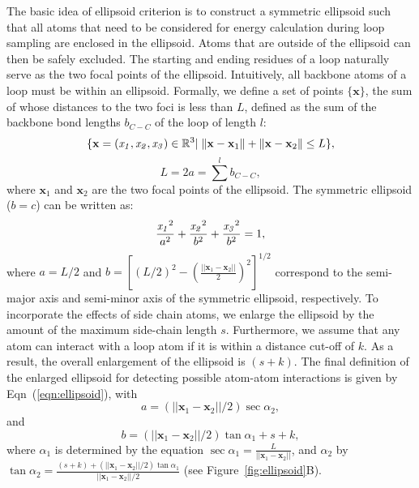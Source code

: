 The basic idea of ellipsoid criterion is to construct a symmetric
ellipsoid such that all atoms that need to be considered for energy
calculation during loop sampling are enclosed in the ellipsoid.
Atoms that are outside of the ellipsoid can then be safely excluded.
The starting and ending residues of a loop naturally serve as the
two focal points of the ellipsoid. Intuitively, all backbone atoms
of a loop must be within an ellipsoid. Formally, we define a set of
points $\{\mathbf{x}\}$, the sum of whose distances to the two foci
is less than $L$, defined as the sum of the backbone bond lengths
$b_{C-C}$ of the loop of length $l$:
$$
\{\mathbf{x} = ({\it x_1}, {\it x_2}, {\it x_3}) \in \mathbb{R}^3|
\; \|\mathbf{x} - \mathbf{x}_1\| + \|\mathbf{x} - \mathbf{x}_2\| \le
L \},
$$
$$
L = 2a = \sum\limits^l b_{C-C},
$$
where $\mathbf{x}_1$ and $\mathbf{x}_2$  are the two focal points of
the ellipsoid. The symmetric ellipsoid ($b = c$) can be written as:
\begin{equation}
\label{eqn:ellipsoid}
    \left. \begin{aligned}
    \frac{{\it x_1}^2}{a^2} + \frac{{\it x_2}^2}{b^2} + \frac{{\it x_3}^2}{b^2} = 1,
    \end{aligned} \right.
\end{equation}
where $a = L/2$ and $b = [(L/2)^2 - (\frac{||\mathbf{x}_1 -
\mathbf{x}_2||}{2})^2]^{1/2}$ correspond to the semi-major axis and
semi-minor axis of the symmetric ellipsoid, respectively. To
incorporate the effects of side chain atoms, we enlarge the
ellipsoid by the amount of the maximum side-chain length $s$.
Furthermore, we assume that any atom can interact with a loop atom
if it is within a distance cut-off of $k$. As a result, the overall
enlargement of the ellipsoid is $(s + k)$. The final definition of
the enlarged ellipsoid for detecting possible atom-atom interactions
is given by Eqn~(\ref{eqn:ellipsoid}), with
\begin{equation}
a = (||\mathbf{x}_1 - \mathbf{x}_2||/2) \sec \alpha_2,
\label{eqn:ellipa}
\end{equation} and
\begin{equation}
b = (||\mathbf{x}_1 - \mathbf{x}_2||/2) \tan \alpha_1 + s + k,
\label{eqn:ellipb}
\end{equation}
where $\alpha_1$ is determined by the equation $\sec \alpha_1 =
\frac{L}{||\mathbf{x}_1 - \mathbf{x}_2||}$, and $\alpha_2$ by $\tan
\alpha_2 = \frac{(s+k) + (||\mathbf{x}_1 - \mathbf{x}_2||/2) \tan
  \alpha_1}{||\mathbf{x}_1 - \mathbf{x}_2||/2}$ (see Figure~\ref{fig:ellipsoid}B).

